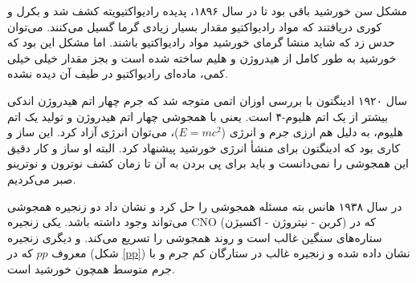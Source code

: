 \documentclass[a4paper,11pt,oneside,openany]{iut-thesis}
\begin{document}
مشکل سن خورشید باقی بود تا در سال ۱۸۹۶، پدیده رادیواکتیویته کشف شد و بکرل و کوری دریافتند که مواد رادیواکتیو مقدار بسیار زیادی گرما گسیل می‌کنند. می‌توان حدس زد که شاید منشا گرمای خورشید مواد رادیواکتیو باشند. اما مشکل این بود که خورشید به طور کامل از هیدروژن و هلیم ساخته شده است و بجز مقدار خیلی خیلی کمی، ماده‌ای رادیواکتیو در طیف آن دیده نشده.

سال ۱۹۲۰ ادینگتون با بررسی اوزان اتمی متوجه شد که جرم چهار اتم هیدروژن اندکی بیشتر از یک اتم هلیوم-۴ است. یعنی با همجوشی چهار اتم هیدروژن و تولید یک اتم هلیوم، به دلیل هم ارزی جرم و انرژی ($E = mc^{2}$)، می‌توان انرژی آزاد کرد. این ساز و کاری بود که ادینگتون برای منشأ انرژی خورشید پیشنهاد کرد. البته او ساز و کار دقیق این همجوشی را نمی‌دانست و باید برای پی بردن به آن تا زمان کشف نوترون و نوترینو صبر می‌کردیم.

در سال ۱۹۳۸ هانس بته مسئله همجوشی را حل کرد و نشان داد دو زنجیره همجوشی می‌تواند وجود داشته باشد. یکی زنجیره CNO (کربن - نیتروژن - اکسیژن) که در ستاره‌های سنگین غالب است و روند همجوشی را تسریع می‌کند. و دیگری زنجیره معروف $pp$ که در (شکل
\ref{pp}) 
نشان داده شده و زنجیره غالب در ستارگان کم جرم و با جرم متوسط همچون خورشید است.
\end{document}
